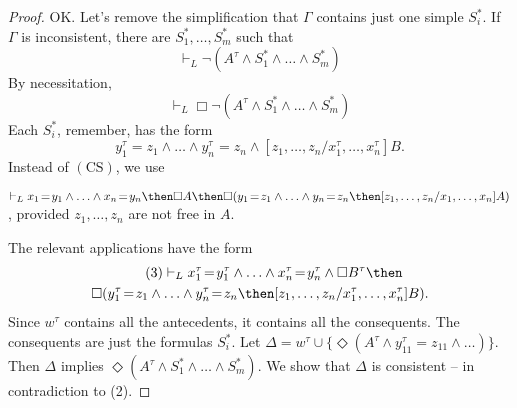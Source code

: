 \documentclass[11pt]{woarticle}
\theoremstyle{break}
\theoremstyle{nonumberplain}
\newcommand{\1}{\;\,|\;\,}
\newcommand{\T}[1]{\ensuremath{(\mathrm{ #1})}}
\newcommand{\itemT}[1]{\item[\T{#1}]}
\begin{document}
\begin{proof}
{    OK. Let's remove the simplification that $\Gamma$ contains just
    one simple $S_i^*$. If $\Gamma$ is inconsistent, there are
    $S_1^*,\ldots,S_m^*$ such that
    \begin{equation}\tag{1}
      \vdash_L \neg (A^\tau \land S_1^* \land \ldots \land S_m^*)
   \end{equation}
    By necessitation,
    \begin{equation}\tag{2}
      \vdash_L \Box \neg (A^\tau \land S_1^* \land \ldots \land S_m^*)
    \end{equation}
    Each $S_i^*$, remember, has the form
    \[
    y_1^\tau\!=\!z_1 \land \ldots \land y_n^\tau\!=\!z_n \land 
    [z_1,\ldots,z_n/x_1^\tau,\ldots,x_n^\tau]B.
    \]
    Instead of \T{CS}, we use
    \begin{semantics}
      \itemT{CS_n} $\vdash_L x_1\!=\!y_1 \land \ldots \land x_n\!=\!y_n
      \then \Box A \then \Box(y_1\!=\!z_1 \land \ldots \land y_n\!=\!z_n
      \then [z_1,\ldots,z_n/x_1,\ldots,x_n]A)$, provided
      $z_1,\ldots,z_n$ are not free in $A$.
    \end{semantics}
    The relevant applications have the form
    \begin{multline}\tag{3}
      \vdash_L x_{1}^\tau\!=\!y_{1}^\tau \land\ldots\land 
      x_{n}^\tau\!=\!y_{n}^\tau \land \Box B^\tau \then\\ 
      \Box(y_{1}^\tau\!=\!z_{1} \land\ldots\land y_{n}^\tau\!=\!z_{n}
      \then [z_{1},\ldots,z_{n}/x_{1}^\tau,\ldots,x_{n}^\tau]B).
    \end{multline}
    Since $w^\tau$ contains all the antecedents, it contains all the
    consequents. The consequents are just the formulas $S_i^*$. Let
    $\Delta = w^\tau \cup \{ \Diamond(A^\tau \land
    y_{11}^\tau\!=\!z_{11} \land \ldots) \}$. Then $\Delta$ implies
    $\Diamond (A^\tau \land S_1^* \land\ldots\land S_m^*)$. We show
    that $\Delta$ is consistent -- in contradiction to (2).

    \bigskip
  
  }



\end{proof}
\end{document}
